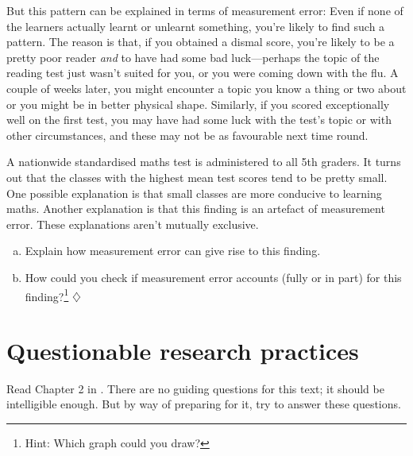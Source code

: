\documentclass[a4paper]{tufte-book}\usepackage[]{graphicx}\usepackage[]{xcolor}
\newcommand*{\parend}[1][$\diamondsuit$]{%
\leavevmode\unskip\penalty9999 \hbox{}\nobreak\hfill
    \quad\hbox{#1}%
}
\begin{document}
\begin{itemize}
 But this pattern can be explained in
 terms of measurement error: Even if none of the learners actually
 learnt or unlearnt something, you're likely to find such a pattern.
 The reason is that, if you obtained a dismal score, you're likely
 to be a pretty poor reader \emph{and} to have had some bad luck---perhaps
 the topic of the reading test just wasn't suited for you, or you
 were coming down with the flu. A couple of weeks later, you might
 encounter a topic you know a thing or two about or you might
 be in better physical shape.
 Similarly, if you scored exceptionally well on the first test,
 you may have had some luck with the test's topic or with other
 circumstances, and these may not be as favourable next time round.
\end{itemize}

A nationwide standardised maths test is administered
to all 5th graders. It turns out that the classes with
the highest mean test scores tend to be pretty small.
One possible explanation is that small classes are more
conducive to learning maths.
Another explanation is that this finding is an artefact
of measurement error. 
These explanations aren't mutually exclusive.

\begin{enumerate}[(a)]
  \item Explain how measurement error can give rise to this finding.
  \item How could you check if measurement error accounts (fully or in part)
        for this finding?\footnote{Hint: Which graph could you draw?}\parend
\end{enumerate}


\chapter{Questionable research practices}

Read Chapter 2 in \citet{Chambers2017}.
There are no guiding questions for this text; it should be
intelligible enough. But by way of preparing for it, try
to answer these questions.
\end{document}

